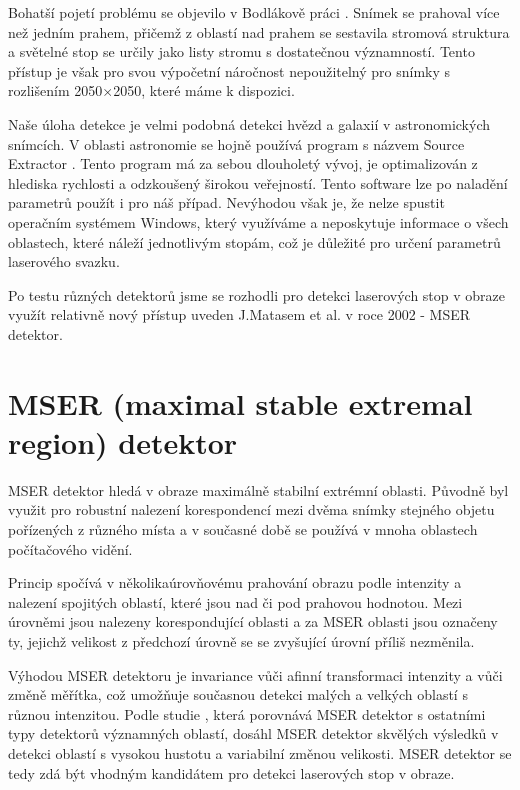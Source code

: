 Bohatší pojetí problému se objevilo v Bodlákově práci \cite{Bodlak2005}. Snímek se prahoval více než jedním prahem, přičemž z oblastí nad prahem se sestavila stromová struktura a světelné stop se určily jako listy stromu s dostatečnou významností. Tento přístup je však pro svou výpočetní náročnost nepoužitelný pro snímky s rozlišením 2050$\times$2050, které máme k dispozici. 

Naše úloha detekce je velmi podobná detekci hvězd a galaxií v astronomických snímcích. V oblasti astronomie se hojně používá program s názvem Source Extractor \cite{SEXarticle}. Tento program má za sebou dlouholetý vývoj, je optimalizován z hlediska rychlosti a odzkoušený širokou veřejností. Tento software lze po naladění parametrů použít i pro náš případ. Nevýhodou však je, že nelze spustit operačním systémem Windows, který využíváme a neposkytuje informace o  všech oblastech, které náleží jednotlivým stopám, což je důležité pro určení parametrů laserového svazku.  

Po testu různých detektorů jsme se rozhodli pro detekci laserových stop v obraze využít relativně nový přístup uveden J.Matasem et al. \cite{Matas} v roce 2002 - MSER detektor. 

\newpage
\section{MSER (maximal stable extremal region) detektor}

MSER detektor hledá v obraze maximálně stabilní extrémní oblasti. Původně byl využit pro robustní nalezení korespondencí mezi dvěma snímky stejného objetu pořízených z různého místa a v současné době se používá v mnoha oblastech počítačového vidění.  

Princip spočívá v několikaúrovňovému prahování obrazu podle intenzity a nalezení spojitých oblastí, které jsou nad či pod prahovou hodnotou. Mezi úrovněmi jsou nalezeny korespondující oblasti a za MSER oblasti jsou označeny ty, jejichž velikost z předchozí úrovně se se zvyšující úrovní příliš nezměnila. 

Výhodou MSER detektoru je invariance vůči afinní transformaci intenzity a vůči změně měřítka, což umožňuje současnou detekci malých a velkých oblastí s různou intenzitou. Podle studie \cite{Comparison}, která porovnává MSER detektor s ostatními typy detektorů významných oblastí, dosáhl MSER detektor skvělých výsledků v detekci oblastí s vysokou hustotu a variabilní změnou velikosti. MSER detektor se tedy zdá být vhodným kandidátem pro detekci laserových stop v obraze.

